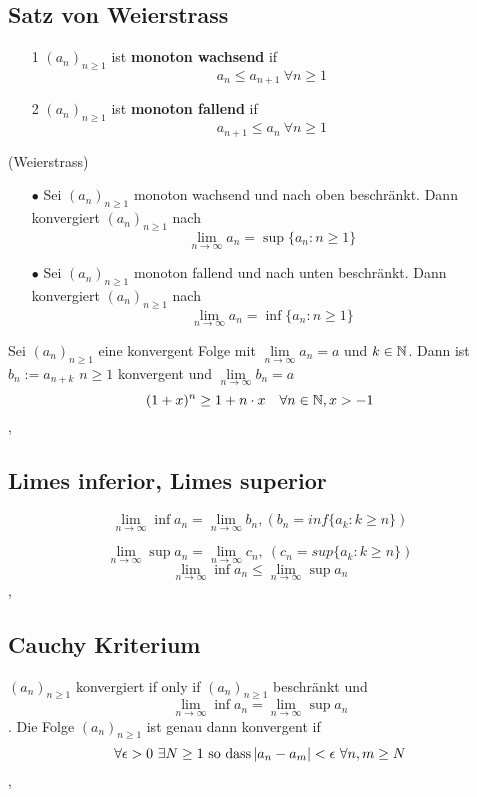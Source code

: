 \subsection{Satz von Weierstrass}
\Def[2.10]
\begin{enumerate}
    \item [1] \((a_n)_{n \geq 1}\) ist \textbf{monoton wachsend} if
    \[a_n \leq a_{n+1} \ \forall n \geq 1\]
    \item [2] \((a_n)_{n \geq 1}\) ist \textbf{monoton fallend} if 
    \[a_{n+1} \leq a_n \ \forall n \geq 1\]
    \newline
    \newline
\end{enumerate}

\Satz[2.11] (Weierstrass)
\begin{enumerate}
    \item [\(\bullet\)] Sei \((a_n)_{n \geq 1}\) monoton wachsend und nach oben beschränkt. Dann konvergiert \((a_n)_{n \geq 1}\) nach \[\lim\limits_{n \rightarrow \infty} a_n = \sup\{a_n : n \geq 1\}\]
    \item [\(\bullet\)] Sei \((a_n)_{n \geq 1}\) monoton fallend und nach unten beschränkt. Dann konvergiert \((a_n)_{n \geq 1}\) nach \[\lim\limits_{n \rightarrow \infty} a_n = \inf\{a_n : n \geq 1\}\]
\end{enumerate}
\Bem[2.13] Sei \((a_n)_{n \geq 1}\) eine konvergent Folge mit $\lim\limits_{n \rightarrow \infty} a_n = a$ und $k \in \mathbb{N}$. Dann ist \newline $b_n := a_{n+k}$ $n \geq 1$ konvergent und $\lim\limits_{n \rightarrow \infty} b_n = a$
\[(1+x)^n \geq 1 + n \cdot x \quad \forall n \in \mathbb{N}, x > -1\]  
\sep

\subsection{Limes inferior, Limes superior}

\[\lim\limits_{n \rightarrow \infty} \inf a_n = \lim\limits_{n \rightarrow \infty} b_n, (b_n = inf \{a_k : k \geq n\})\]


\[\lim\limits_{n \rightarrow \infty} \sup a_n = \lim\limits_{n \rightarrow \infty} c_n, \ (c_n = sup \{a_k : k \geq n\})\]
\[\lim\limits_{n \rightarrow \infty} \inf a_n \leq \lim\limits_{n \rightarrow \infty} \sup a_n\]
\sep
\subsection{Cauchy Kriterium}
\Lemma[2.19] \((a_n)_{n \geq 1}\) konvergiert if only if \((a_n)_{n \geq 1}\) beschränkt und \[\lim\limits_{n \rightarrow \infty} \inf a_n = \lim\limits_{n \rightarrow \infty} \sup a_n\] 
. \newline Die Folge \((a_n)_{n \geq 1}\) ist genau dann konvergent if \[\forall \epsilon > 0 \ \exists N \geq 1 \  \text{so dass} \left\lvert a_n - a_m \right\rvert < \epsilon \ \forall n,m \geq N\]
\sep
